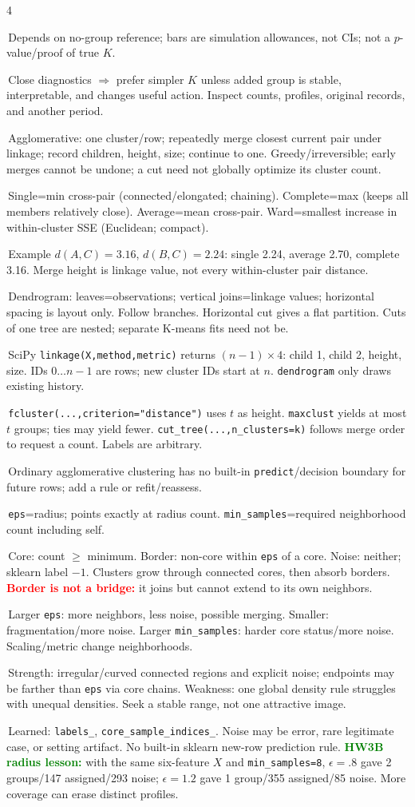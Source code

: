 \documentclass[10pt]{article}
\newcommand{\topic}[1]{\vspace{2.5ex}{\color{blue}\bfseries\fontsize{6.0}{6.1}\selectfont #1}\par\vspace{0.1pt}}
\newcommand{\key}[1]{\textcolor{green}{\textbf{#1}}}
\newcommand{\trap}[1]{\textcolor{red}{\textbf{#1}}}
\newcommand{\code}[1]{\texttt{#1}}
\newcommand{\bitem}{\par\vspace{0.8ex}\hangindent=0.09in\hangafter=1\textbullet\,}
\begin{document}
\begin{multicols*}{4}
\bitem Depends on no-group reference; bars are simulation allowances, not CIs; not a $p$-value/proof of true $K$.
\bitem Close diagnostics $\Rightarrow$ prefer simpler $K$ unless added group is stable, interpretable, and changes useful action. Inspect counts, profiles, original records, and another period.

\columnbreak
\topic{HIERARCHICAL CLUSTERING}
\bitem Agglomerative: one cluster/row; repeatedly merge closest current pair under linkage; record children, height, size; continue to one. Greedy/irreversible; early merges cannot be undone; a cut need not globally optimize its cluster count.
\bitem Single=min cross-pair (connected/elongated; chaining). Complete=max (keeps all members relatively close). Average=mean cross-pair. Ward=smallest increase in within-cluster SSE (Euclidean; compact).
\bitem Example $d(A,C)=3.16$, $d(B,C)=2.24$: single 2.24, average 2.70, complete 3.16. Merge height is linkage value, not every within-cluster pair distance.
\bitem Dendrogram: leaves=observations; vertical joins=linkage values; horizontal spacing is layout only. Follow branches. Horizontal cut gives a flat partition. Cuts of one tree are nested; separate K-means fits need not be.
\bitem SciPy \code{linkage(X,method,metric)} returns $(n-1)\times4$: child 1, child 2, height, size. IDs $0\ldots n-1$ are rows; new cluster IDs start at $n$. \code{dendrogram} only draws existing history.
\bitem \code{fcluster(...,criterion="distance")} uses $t$ as height. \code{maxclust} yields at most $t$ groups; ties may yield fewer. \code{cut\_tree(...,n\_clusters=k)} follows merge order to request a count. Labels are arbitrary.
\bitem Ordinary agglomerative clustering has no built-in \code{predict}/decision boundary for future rows; add a rule or refit/reassess.

\topic{DBSCAN}
\bitem \code{eps}=radius; points exactly at radius count. \code{min\_samples}=required neighborhood count including self.
\bitem Core: count $\ge$ minimum. Border: non-core within \code{eps} of a core. Noise: neither; sklearn label $-1$. Clusters grow through connected cores, then absorb borders. \trap{Border is not a bridge:} it joins but cannot extend to its own neighbors.
\bitem Larger \code{eps}: more neighbors, less noise, possible merging. Smaller: fragmentation/more noise. Larger \code{min\_samples}: harder core status/more noise. Scaling/metric change neighborhoods.
\bitem Strength: irregular/curved connected regions and explicit noise; endpoints may be farther than \code{eps} via core chains. Weakness: one global density rule struggles with unequal densities. Seek a stable range, not one attractive image.
\bitem Learned: \code{labels\_}, \code{core\_sample\_indices\_}. Noise may be error, rare legitimate case, or setting artifact. No built-in sklearn new-row prediction rule.
\key{HW3B radius lesson:} with the same six-feature $X$ and \code{min\_samples=8}, $\epsilon=.8$ gave 2 groups/147 assigned/293 noise; $\epsilon=1.2$ gave 1 group/355 assigned/85 noise. More coverage can erase distinct profiles.


\end{multicols*}
\end{document}
